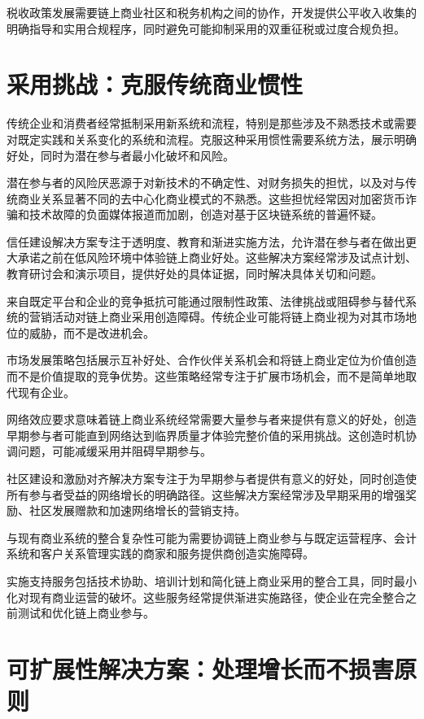 \documentclass[
  Letterpaper,
]{scrbook}
\begin{document}
税收政策发展需要链上商业社区和税务机构之间的协作，开发提供公平收入收集的明确指导和实用合规程序，同时避免可能抑制采用的双重征税或过度合规负担。

\section{采用挑战：克服传统商业惯性}\label{ux91c7ux7528ux6311ux6218ux514bux670dux4f20ux7edfux5546ux4e1aux60efux6027}

传统企业和消费者经常抵制采用新系统和流程，特别是那些涉及不熟悉技术或需要对既定实践和关系变化的系统和流程。克服这种采用惯性需要系统方法，展示明确好处，同时为潜在参与者最小化破坏和风险。

潜在参与者的风险厌恶源于对新技术的不确定性、对财务损失的担忧，以及对与传统商业关系显著不同的去中心化商业模式的不熟悉。这些担忧经常因对加密货币诈骗和技术故障的负面媒体报道而加剧，创造对基于区块链系统的普遍怀疑。

信任建设解决方案专注于透明度、教育和渐进实施方法，允许潜在参与者在做出更大承诺之前在低风险环境中体验链上商业好处。这些解决方案经常涉及试点计划、教育研讨会和演示项目，提供好处的具体证据，同时解决具体关切和问题。

来自既定平台和企业的竞争抵抗可能通过限制性政策、法律挑战或阻碍参与替代系统的营销活动对链上商业采用创造障碍。传统企业可能将链上商业视为对其市场地位的威胁，而不是改进机会。

市场发展策略包括展示互补好处、合作伙伴关系机会和将链上商业定位为价值创造而不是价值提取的竞争优势。这些策略经常专注于扩展市场机会，而不是简单地取代现有企业。

网络效应要求意味着链上商业系统经常需要大量参与者来提供有意义的好处，创造早期参与者可能直到网络达到临界质量才体验完整价值的采用挑战。这创造时机协调问题，可能减缓采用并阻碍早期参与。

社区建设和激励对齐解决方案专注于为早期参与者提供有意义的好处，同时创造使所有参与者受益的网络增长的明确路径。这些解决方案经常涉及早期采用的增强奖励、社区发展赠款和加速网络增长的营销支持。

与现有商业系统的整合复杂性可能为需要协调链上商业参与与既定运营程序、会计系统和客户关系管理实践的商家和服务提供商创造实施障碍。

实施支持服务包括技术协助、培训计划和简化链上商业采用的整合工具，同时最小化对现有商业运营的破坏。这些服务经常提供渐进实施路径，使企业在完全整合之前测试和优化链上商业参与。

\section{可扩展性解决方案：处理增长而不损害原则}\label{ux53efux6269ux5c55ux6027ux89e3ux51b3ux65b9ux6848ux5904ux7406ux589eux957fux800cux4e0dux635fux5bb3ux539fux5219}
\end{document}
